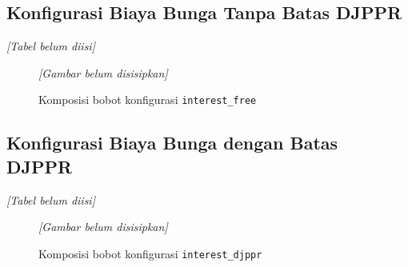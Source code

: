         \subsection{Konfigurasi Biaya Bunga Tanpa Batas DJPPR}\label{subsec:interest free}

        \begin{table}[H]
            \centering
            \caption{Komposisi optimal konfigurasi \texttt{interest\_free} dibandingkan eksisting 2024}\label{tab:composition interest free}
            \textit{[Tabel belum diisi]}
        \end{table}

        \begin{figure}[H]
            \centering
            \textit{[Gambar belum disisipkan]}
            \caption{Komposisi bobot konfigurasi \texttt{interest\_free}}\label{fig:composition interest free}
        \end{figure}

        \subsection{Konfigurasi Biaya Bunga dengan Batas DJPPR}\label{subsec:interest djppr}

        \begin{table}[H]
            \centering
            \caption{Komposisi optimal konfigurasi \texttt{interest\_djppr} dibandingkan eksisting 2024}\label{tab:composition interest djppr}
            \textit{[Tabel belum diisi]}
        \end{table}

        \begin{figure}[H]
            \centering
            \textit{[Gambar belum disisipkan]}
            \caption{Komposisi bobot konfigurasi \texttt{interest\_djppr}}\label{fig:composition interest djppr}
        \end{figure}

